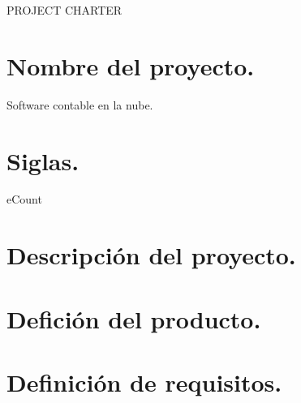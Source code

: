 \begin{center}
	\huge{PROJECT CHARTER}
\end{center}

\chapter*{Nombre del proyecto.}
%
Software contable en la nube.

\chapter*{Siglas.}
%
eCount

\chapter*{Descripci\'on del proyecto.}

\chapter*{Defici\'on del producto.}

\chapter*{Definici\'on de requisitos.}